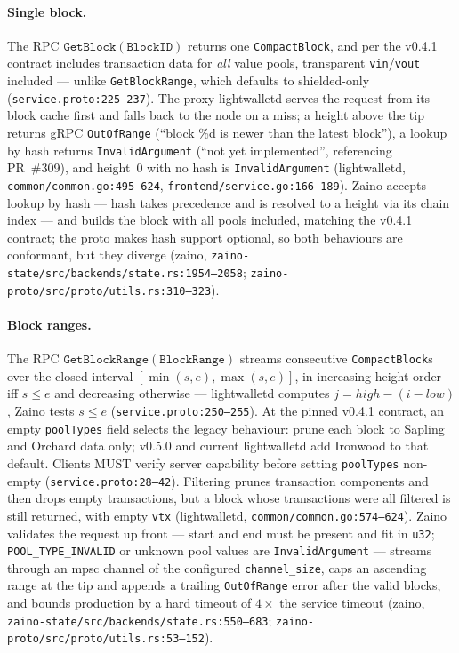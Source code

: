 \documentclass[11pt,a4paper]{article}
\theoremstyle{definition}
\begin{document}
\paragraph{Single block.} The RPC $\mathtt{GetBlock}(\mathtt{BlockID})$
returns one \texttt{CompactBlock}, and per the v0.4.1 contract includes
transaction data for \emph{all} value pools, transparent
\texttt{vin}/\texttt{vout} included --- unlike \texttt{GetBlockRange},
which defaults to shielded-only (\texttt{service.proto:225--237}).
The proxy lightwalletd serves the request from its block cache first and
falls back to the node on a miss; a height above the tip returns gRPC
\texttt{OutOfRange} (``block \%d is newer than the latest block''), a
lookup by hash returns \texttt{InvalidArgument} (``not yet implemented'',
referencing PR~\#309), and height~0 with no hash is
\texttt{InvalidArgument} (\textsf{lightwalletd},
\texttt{common/common.go:495--624}, \texttt{frontend/service.go:166--189}).
Zaino accepts lookup by hash --- hash takes precedence and is resolved to
a height via its chain index --- and builds the block with all pools
included, matching the v0.4.1 contract; the proto makes hash support
optional, so both behaviours are conformant, but they diverge
(\textsf{zaino}, \texttt{zaino-state/src/backends/state.rs:1954--2058};
\texttt{zaino-proto/src/proto/utils.rs:310--323}).

\paragraph{Block ranges.} The RPC
$\mathtt{GetBlockRange}(\mathtt{BlockRange})$ streams consecutive
\texttt{CompactBlock}s over the closed interval
$[\min(s,e), \max(s,e)]$, in increasing height order iff $s \le e$ and
decreasing otherwise --- lightwalletd computes
$j = \mathit{high} - (i - \mathit{low})$, Zaino tests
$s \le e$ (\texttt{service.proto:250--255}).
At the pinned v0.4.1 contract, an empty \texttt{poolTypes} field selects
the legacy behaviour: prune each block to Sapling and Orchard data only;
v0.5.0 and current lightwalletd add Ironwood to that default. Clients MUST
verify server capability before setting \texttt{poolTypes} non-empty
(\texttt{service.proto:28--42}). Filtering prunes transaction components
and then drops empty transactions, but a block whose transactions were all
filtered is still returned, with empty \texttt{vtx}
(\textsf{lightwalletd}, \texttt{common/common.go:574--624}). Zaino
validates the request up front --- start and end must be present and fit
in \texttt{u32}; \texttt{POOL\_TYPE\_INVALID} or unknown pool values are
\texttt{InvalidArgument} --- streams through an mpsc channel of the
configured \texttt{channel\_size}, caps an ascending range at the tip and
appends a trailing \texttt{OutOfRange} error after the valid blocks, and
bounds production by a hard timeout of $4 \times$ the service timeout
(\textsf{zaino}, \texttt{zaino-state/src/backends/state.rs:550--683};
\texttt{zaino-proto/src/proto/utils.rs:53--152}).
\end{document}
